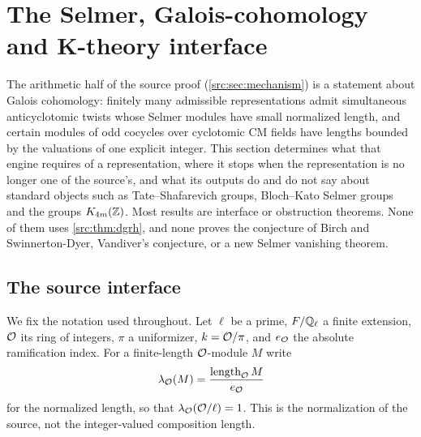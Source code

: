 \providecommand{\spnHS}{\mathrm{HS}}
\providecommand{\spncodim}{\operatorname{codim}}
\providecommand{\spnim}{\operatorname{im}}
\providecommand{\spnE}{\mathbb{E}}
\providecommand{\spnP}{\mathbb{P}}
\providecommand{\spnTV}{d_{\mathrm{TV}}}
\providecommand{\spnStab}{\operatorname{Stab}}
\providecommand{\spnMat}{\operatorname{Mat}}
\providecommand{\spnDD}{\mathfrak{D}}
\providecommand{\spnT}{\mathsf{T}}
\providecommand{\spnqbin}[3]{\genfrac{[}{]}{0pt}{}{#1}{#2}_{#3}}
\providecommand{\spnOrth}{\mathcal{O}}
\providecommand{\spnTame}{\mathcal{T}}
\providecommand{\spnEmb}{\mathcal{E}}
\providecommand{\spnAlt}{\operatorname{Alt}}
\providecommand{\spncoker}{\operatorname{coker}}
\section{The Selmer, Galois-cohomology and K-theory interface}\label{sec:sel}

\providecommand{\sellen}{\operatorname{length}}
\providecommand{\selSha}{\operatorname{Sha}}
\providecommand{\selnum}{\operatorname{num}}
\providecommand{\selT}{\mathsf{t}}
\providecommand{\selA}{\mathcal{A}}

The arithmetic half of the source proof (\cref{src:sec:mechanism}) is a
statement about Galois cohomology: finitely many admissible representations
admit simultaneous anticyclotomic twists whose Selmer modules have small
normalized length, and certain modules of odd cocycles over cyclotomic CM
fields have lengths bounded by the valuations of one explicit integer. This
section determines what that engine requires of a representation, where it
stops when the representation is no longer one of the source's, and what its
outputs do and do not say about standard objects such as Tate--Shafarevich
groups, Bloch--Kato Selmer groups and the groups $K_{4m}(\mathbb{Z})$. Most results
are interface or obstruction theorems. None of them uses
\cref{src:thm:dgrh}, and none proves the conjecture of Birch and
Swinnerton-Dyer, Vandiver's conjecture, or a new Selmer vanishing theorem.

\subsection{The source interface}\label{sel:sec:interface}

We fix the notation used throughout. Let $\ell$ be a prime, $F/\mathbb{Q}_\ell$ a
finite extension, $\mathcal{O}$ its ring of integers, $\pi$ a uniformizer,
$k=\mathcal{O}/\pi$, and $e_{\mathcal{O}}$ the absolute ramification index. For a
finite-length $\mathcal{O}$-module $M$ write
\[
 \lambda_{\OO}(M)=\frac{\sellen_{\OO}M}{e_{\OO}}
\]
for the normalized length, so that $\lambda_{\mathcal{O}}(\mathcal{O}/\ell)=1$. This is the
normalization of the source, not the integer-valued composition length.

